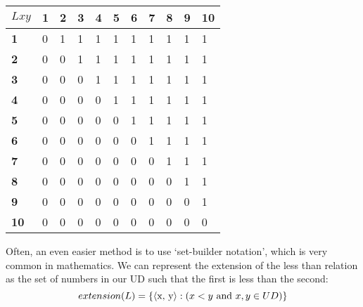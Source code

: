 \begin{table}[h!]
\centering
\begin{tabular}{l|llllllllll}
$Lxy$         & \textbf{1} & \textbf{2} & \textbf{3} & \textbf{4} & \textbf{5} & \textbf{6} & \textbf{7} & \textbf{8} & \textbf{9} & \textbf{10} \\ \hline
\textbf{1}  & 0          & 1          & 1          & 1          & 1          & 1          & 1          & 1          & 1          & 1           \\
\textbf{2}  & 0          & 0          & 1          & 1          & 1          & 1          & 1          & 1          & 1          & 1           \\
\textbf{3}  & 0          & 0          & 0          & 1          & 1          & 1          & 1          & 1          & 1          & 1           \\
\textbf{4}  & 0          & 0          & 0          & 0          & 1          & 1          & 1          & 1          & 1          & 1           \\
\textbf{5}  & 0          & 0          & 0          & 0          & 0          & 1          & 1          & 1          & 1          & 1           \\
\textbf{6}  & 0          & 0          & 0          & 0          & 0          & 0          & 1          & 1          & 1          & 1           \\
\textbf{7}  & 0          & 0          & 0          & 0          & 0          & 0          & 0          & 1          & 1          & 1           \\
\textbf{8}  & 0          & 0          & 0          & 0          & 0          & 0          & 0          & 0          & 1          & 1           \\
\textbf{9}  & 0          & 0          & 0          & 0          & 0          & 0          & 0          & 0          & 0          & 1           \\
\textbf{10} & 0          & 0          & 0          & 0          & 0          & 0          & 0          & 0          & 0          & 0          
\end{tabular}
\end{table}

{\color{black} Often, an even easier method is to use `set-builder notation', which is very common in mathematics. We can represent the extension of the less than relation as the set of numbers in our UD such that the first is less than the second:} $$extension(L) = \{ \mbox{\ensuremath{\mathopen{\langle}}x, y\ensuremath{\mathclose{\rangle}}} : (x < y \textrm{ and } x, y \in UD)\}$$


